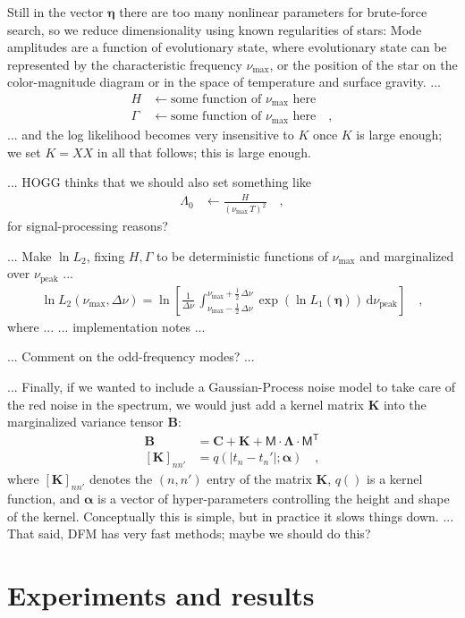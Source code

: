 \documentclass[modern]{aastex63}
\newcommand{\nupeak}{\nu_\mathrm{peak}}
\newcommand{\numax}{\nu_\mathrm{max}}
\newcommand{\dd}{\mathrm{d}}
\newcommand{\T}{^{\!\mathsf{T}\!}}
\renewcommand{\vector}[1]{\boldsymbol{#1}}
\newcommand{\valpha}{\vector{\alpha}}
\newcommand{\veta}{\vector{\eta}}
\renewcommand{\tensor}[1]{\mathbf{#1}}
\newcommand{\tB}{\tensor{B}}
\newcommand{\tC}{\tensor{C}}
\newcommand{\tK}{\tensor{K}}
\newcommand{\tLambda}{\tensor{\Lambda}}
\newcommand{\mat}[1]{\mathsf{#1}}
\newcommand{\mM}{\mat{M}}
\begin{document}
Still in the vector $\veta$ there are too many nonlinear parameters for brute-force
search, so we reduce dimensionality
using known regularities of stars: 
Mode amplitudes are a function of evolutionary
state, where evolutionary state can be represented by the characteristic
frequency $\numax$, or the position of
the star on the color-magnitude diagram or in the space of temperature
and surface gravity.
...
\begin{align}
  H &\leftarrow \mbox{some function of $\numax$ here}
  \\
  \Gamma &\leftarrow \mbox{some function of $\numax$ here}
  \quad ,
\end{align}
... and the log likelihood becomes very insensitive to $K$ once $K$ is large enough;
we set $K=XX$ in all that follows; this is large enough.

... HOGG thinks that we should also set something like
\begin{align}
  \Lambda_0 &\leftarrow \frac{H}{(\numax\,T)^2}
  \quad ,
\end{align}
for signal-processing reasons?

... Make $\ln L_2$, fixing $H, \Gamma$ to be deterministic functions of $\numax$
and marginalized over $\nupeak$  ...
\begin{align}
  \ln L_2(\numax,\Delta\nu) = \ln \left[\frac{1}{\Delta\nu}\,\int_{\numax-\frac{1}{2}\,\Delta\nu}^{\numax+\frac{1}{2}\,\Delta\nu} \exp\left(\ln L_1(\veta)\right)\,\dd\nupeak\right]
  \quad ,
\end{align}
where ...
... implementation notes ...

... Comment on the odd-frequency modes? ...

... Finally, if we wanted to include a Gaussian-Process noise model to
take care of the red noise in the spectrum, we would just add a kernel
matrix $\tK$ into the marginalized variance tensor $\tB$:
\begin{align}
  \tB &= \tC + \tK + \mM\cdot\tLambda\cdot\mM\T
  \\
  [\tK]_{nn'} &= q(|t_n - t_n'|; \valpha)
  \quad ,
\end{align}
where $[\tK]_{nn'}$ denotes the $(n, n')$ entry of the matrix $\tK$,
$q()$ is a kernel function, and $\valpha$ is a vector of hyper-parameters
controlling the height and shape of the kernel.
Conceptually this is simple, but in practice it slows things down.
... That said, DFM has very fast methods; maybe we should do this?

\section{Experiments and results}
\end{document}
